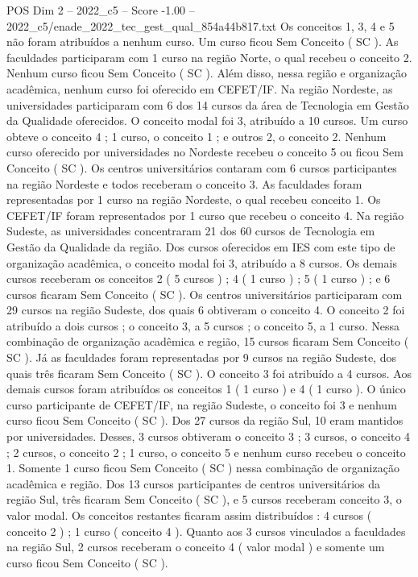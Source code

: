 \begin{textsample}{POS Dim 2 – 2022\_c5 – Score -1.00 – 2022\_c5/enade\_2022\_tec\_gest\_qual\_854a44b817.txt}
Os conceitos 1, 3, 4 e 5 não foram atribuídos a nenhum curso.
Um curso ficou Sem Conceito ( SC ).
As faculdades participaram com 1 curso na região Norte, o qual recebeu o conceito 2.
Nenhum curso ficou Sem Conceito ( SC ).
Além disso, nessa região e organização acadêmica, nenhum curso foi oferecido em CEFET/IF.
Na região Nordeste, as universidades participaram com 6 dos 14 cursos da área de Tecnologia em Gestão da Qualidade oferecidos.
O conceito modal foi 3, atribuído a 10 cursos.
Um curso obteve o conceito 4 ; 1 curso, o conceito 1 ; e outros 2, o conceito 2.
Nenhum curso oferecido por universidades no Nordeste recebeu o conceito 5 ou ficou Sem Conceito ( SC ).
Os centros universitários contaram com 6 cursos participantes na região Nordeste e todos receberam o conceito 3.
As faculdades foram representadas por 1 curso na região Nordeste, o qual recebeu conceito 1.
Os CEFET/IF foram representados por 1 curso que recebeu o conceito 4.
Na região Sudeste, as universidades concentraram 21 dos 60 cursos de Tecnologia em Gestão da Qualidade da região.
Dos cursos oferecidos em IES com este tipo de organização acadêmica, o conceito modal foi 3, atribuído a 8 cursos.
Os demais cursos receberam os conceitos 2 ( 5 cursos ) ; 4 ( 1 curso ) ; 5 ( 1 curso ) ; e 6 cursos ficaram Sem Conceito ( SC ).
Os centros universitários participaram com 29 cursos na região Sudeste, dos quais 6 obtiveram o conceito 4.
O conceito 2 foi atribuído a dois cursos ; o conceito 3, a 5 cursos ; o conceito 5, a 1 curso.
Nessa combinação de organização acadêmica e região, 15 cursos ficaram Sem Conceito ( SC ).
Já as faculdades foram representadas por 9 cursos na região Sudeste, dos quais três ficaram Sem Conceito ( SC ).
O conceito 3 foi atribuído a 4 cursos.
Aos demais cursos foram atribuídos os conceitos 1 ( 1 curso ) e 4 ( 1 curso ).
O único curso participante de CEFET/IF, na região Sudeste, o conceito foi 3 e nenhum curso ficou Sem Conceito ( SC ).
Dos 27 cursos da região Sul, 10 eram mantidos por universidades.
Desses, 3 cursos obtiveram o conceito 3 ; 3 cursos, o conceito 4 ; 2 cursos, o conceito 2 ; 1 curso, o conceito 5 e nenhum curso recebeu o conceito 1.
Somente 1 curso ficou Sem Conceito ( SC ) nessa combinação de organização acadêmica e região.
Dos 13 cursos participantes de centros universitários da região Sul, três ficaram Sem Conceito ( SC ), e 5 cursos receberam conceito 3, o valor modal.
Os conceitos restantes ficaram assim distribuídos : 4 cursos ( conceito 2 ) ; 1 curso ( conceito 4 ).
Quanto aos 3 cursos vinculados a faculdades na região Sul, 2 cursos receberam o conceito 4 ( valor modal ) e somente um curso ficou Sem Conceito ( SC ).

\end{textsample}
